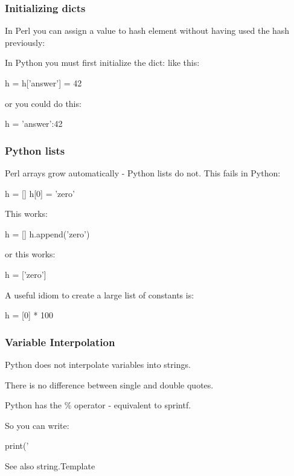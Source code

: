 \begin{frame}[fragile]
\frametitle{Initializing dicts}
In Perl you can assign a value to hash element without having
used the hash previously:


In Python you must first initialize the dict:
like this:
\begin{python}
    h = {}
    h['answer'] = 42
\end{python}
or you could do this:
\begin{python}
    h = {'answer':42}
\end{python}
\end{frame}

\begin{frame}[fragile]
\frametitle{Python lists}
Perl arrays grow automatically - Python lists do not.
This fails in Python:
\begin{python}
    h = []
    h[0] = 'zero'
\end{python}
This works:
\begin{python}
    h = []
    h.append('zero')
\end{python}
or this works:
\begin{python}
    h = ['zero']
\end{python}

A useful idiom to create a large list of constants is:
\begin{python}
    h = [0] * 100 
\end{python}
\end{frame}
\begin{frame}[fragile]
\frametitle{Variable Interpolation}

Python does not interpolate variables into strings.

There is no difference between single and double quotes.

Python has the \% operator - equivalent to sprintf.

So you can write:
\begin{python}
    print('%
\end{python}

See also string.Template 
\end{frame}

